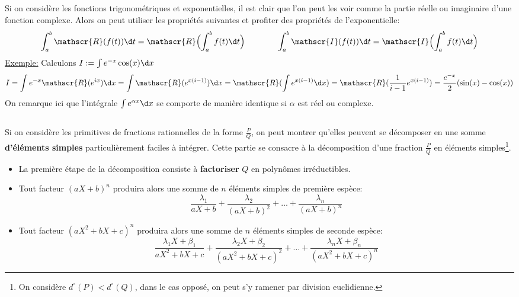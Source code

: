 \subsection*{}

Si on considère les fonctions trigonométriques et exponentielles, il est clair que l'on peut les voir comme la partie réelle ou imaginaire d'une fonction complexe.\+
Alors on peut utiliser les propriétés suivantes et profiter des propriétés de l'exponentielle:
\[
   \int_{a}^{b} \mathscr{R}(f(t)) \d t = \mathscr{R}\Bigl(\int_{a}^{b} f(t) \d t\Bigl) 
   \quad\quad\quad\quad
   \int_{a}^{b} \mathscr{I}(f(t)) \d t = \mathscr{I}\Bigl(\int_{a}^{b} f(t) \d t\Bigl) 
\]
\underline{Exemple:} Calculons \(I := \int e^{-x}\cos(x) \d x\)
\[
   I = \int e^{-x}\mathscr{R}(e^{ix}) \d x = \int \mathscr{R}(e^{x(i- 1)}) \d x = \mathscr{R}(\int e^{x(i - 1)} \d x) = \mathscr{R}(\frac{1}{i - 1}e^{x(i - 1)}) = \frac{e^{-x}}{2}(\sin(x) - \cos(x))
\]
On remarque ici que l'intégrale \(\int e^{\alpha x} \d x\) se comporte de manière identique si \(\alpha\) est réel ou complexe.

\subsection*{}

Si on considère les primitives de fractions rationnelles de la forme \(\frac{P}{Q}\), on peut montrer qu'elles peuvent se décomposer en une somme \textbf{d'éléments simples} particulièrement faciles à intégrer. Cette partie se consacre à la décomposition d'une fraction \(\frac{P}{Q}\) en éléments simples\footnote[1]{On considère \(d^{\circ}(P) < d^{\circ}(Q)\), dans le cas opposé, on peut s'y ramener par division euclidienne.}.
\begin{center}
   \begin{itemize}
      \item La première étape de la décomposition consiste à \textbf{factoriser} \(Q\) en polynômes irréductibles.
      \item Tout facteur \((aX + b)^n\) produira alors une somme de \(n\) éléments simples de première espèce:
      \[
         \frac{\lambda_1}{aX+b} + \frac{\lambda_2}{(aX+b)^2} + \ldots + \frac{\lambda_n}{(aX+b)^n}
      \] 
      \item Tout facteur \((aX^2 + bX + c)^n\) produira alors une somme de \(n\) éléments simples de seconde espèce:
      \[
         \frac{\lambda_1X+\beta_1}{aX^2+bX+c} + \frac{\lambda_2X+\beta_2}{(aX^2+bX+c)^2} + \ldots + \frac{\lambda_nX+\beta_n}{(aX^2+bX+c)^n}
      \]
   \end{itemize}
\end{center}


